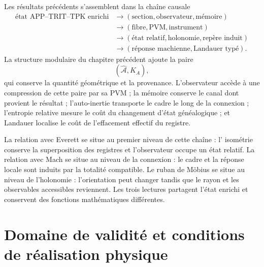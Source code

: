 Les résultats précédents s'assemblent dans la chaîne causale
\begin{equation}
 \begin{aligned}
 \text{état APP--TRIT--TPK enrichi}
 &\longrightarrow
 (\text{section},\text{observateur},\text{mémoire})\\
 &\longrightarrow
 (\text{fibre},\text{PVM},\text{instrument})\\
 &\longrightarrow
 (\text{état relatif},\text{holonomie},\text{repère induit})\\
 &\longrightarrow
 (\text{réponse machienne},\text{Landauer typé}).
 \end{aligned}
 \label{eq:rm-obs-causal-chain}
\end{equation}
La structure modulaire du chapitre précédent ajoute la paire
\begin{equation}
 (\widehat{\mathcal A},K_A),
 \label{eq:rm-obs-area-modular-pair}
\end{equation}
qui conserve la quantité géométrique et la provenance. L'observateur accède à une
compression de cette paire par sa PVM ; la mémoire conserve le canal dont
provient le résultat ; l'auto-inertie transporte le cadre le long de
la connexion ; l'entropie relative mesure le coût du changement d'état
généalogique ; et Landauer localise le coût de l'effacement effectif du
registre.

La relation avec Everett se situe au premier niveau de cette chaîne : l'
isométrie conserve la superposition des registres et l'observateur occupe un
état relatif. La relation avec Mach se situe au niveau de la connexion :
le cadre et la réponse locale sont induits par la totalité compatible. Le
ruban de Möbius se situe au niveau de l'holonomie : l'orientation
peut changer tandis que le rayon et les observables accessibles reviennent. Les
trois lectures partagent l'état enrichi et conservent des fonctions
mathématiques différentes.

\section{Domaine de validité et conditions de réalisation physique}

